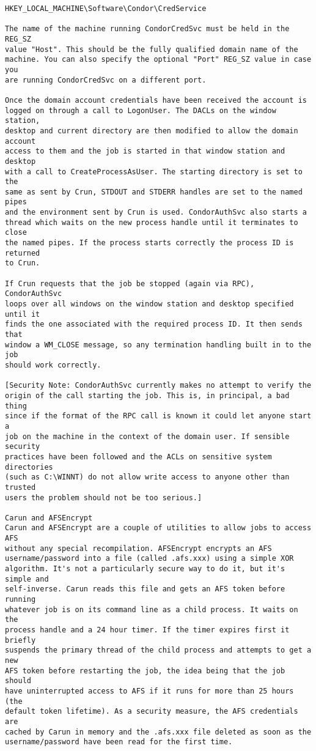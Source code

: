 \begin{verbatim}
HKEY_LOCAL_MACHINE\Software\Condor\CredService

The name of the machine running CondorCredSvc must be held in the REG_SZ 
value "Host". This should be the fully qualified domain name of the 
machine. You can also specify the optional "Port" REG_SZ value in case you 
are running CondorCredSvc on a different port.

Once the domain account credentials have been received the account is 
logged on through a call to LogonUser. The DACLs on the window station, 
desktop and current directory are then modified to allow the domain account 
access to them and the job is started in that window station and desktop 
with a call to CreateProcessAsUser. The starting directory is set to the 
same as sent by Crun, STDOUT and STDERR handles are set to the named pipes 
and the environment sent by Crun is used. CondorAuthSvc also starts a 
thread which waits on the new process handle until it terminates to close 
the named pipes. If the process starts correctly the process ID is returned 
to Crun.

If Crun requests that the job be stopped (again via RPC), CondorAuthSvc 
loops over all windows on the window station and desktop specified until it 
finds the one associated with the required process ID. It then sends that 
window a WM_CLOSE message, so any termination handling built in to the job 
should work correctly.

[Security Note: CondorAuthSvc currently makes no attempt to verify the 
origin of the call starting the job. This is, in principal, a bad thing 
since if the format of the RPC call is known it could let anyone start a 
job on the machine in the context of the domain user. If sensible security 
practices have been followed and the ACLs on sensitive system directories 
(such as C:\WINNT) do not allow write access to anyone other than trusted 
users the problem should not be too serious.]

Carun and AFSEncrypt
Carun and AFSEncrypt are a couple of utilities to allow jobs to access AFS 
without any special recompilation. AFSEncrypt encrypts an AFS 
username/password into a file (called .afs.xxx) using a simple XOR 
algorithm. It's not a particularly secure way to do it, but it's simple and 
self-inverse. Carun reads this file and gets an AFS token before running 
whatever job is on its command line as a child process. It waits on the 
process handle and a 24 hour timer. If the timer expires first it briefly 
suspends the primary thread of the child process and attempts to get a new 
AFS token before restarting the job, the idea being that the job should 
have uninterrupted access to AFS if it runs for more than 25 hours (the 
default token lifetime). As a security measure, the AFS credentials are 
cached by Carun in memory and the .afs.xxx file deleted as soon as the 
username/password have been read for the first time.


\end{verbatim}
